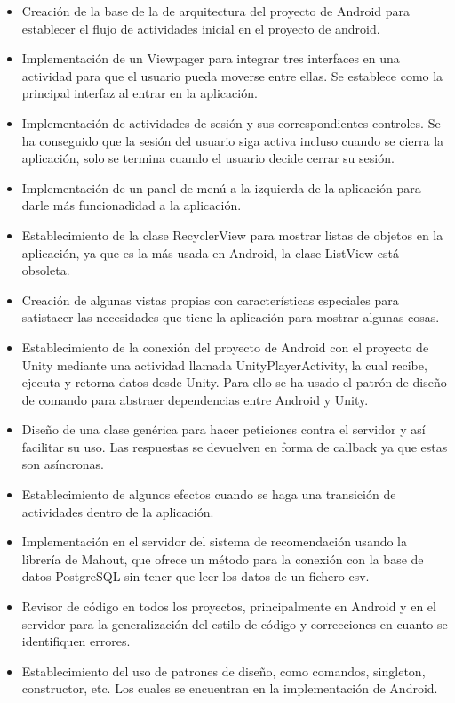 \begin{itemize}
            \item Creación de la base de la de arquitectura del proyecto de Android para establecer el flujo de actividades inicial en el proyecto de android.
            \item Implementación de un Viewpager para integrar tres interfaces en una actividad para que el usuario pueda moverse entre ellas. Se establece como la principal 
            interfaz al entrar en la aplicación.
            \item Implementación de actividades de sesión y sus correspondientes controles. Se ha conseguido que la sesión del usuario siga activa incluso cuando se cierra 
            la aplicación, solo se termina cuando el usuario decide cerrar su sesión.
            \item Implementación de un panel de menú a la izquierda de la aplicación para darle más funcionadidad a la aplicación.
            \item Establecimiento de la clase RecyclerView para mostrar listas de objetos en la aplicación, ya que es la más usada en Android, la clase ListView está obsoleta.
            \item Creación de algunas vistas propias con características especiales para satistacer las necesidades 
            que tiene la aplicación para mostrar algunas cosas.
            \item Establecimiento de la conexión del proyecto de Android con el proyecto de Unity mediante una actividad llamada UnityPlayerActivity, la cual recibe, ejecuta y retorna datos
            desde Unity. Para ello se ha usado el patrón de diseño de comando para abstraer dependencias entre Android y Unity.
            \item Diseño de una clase genérica para hacer peticiones contra el servidor y así facilitar su uso. Las respuestas se devuelven 
            en forma de callback ya que estas son asíncronas.
            \item Establecimiento de algunos efectos cuando se haga una transición de actividades dentro de la aplicación.
            \item Implementación en el servidor del sistema de recomendación usando la 
            librería de Mahout, que ofrece un método para la conexión con la base de datos 
            PostgreSQL sin tener que leer los datos de un fichero csv.
            \item Revisor de código en todos los proyectos, principalmente en Android y en el servidor para la generalización del estilo de código y correcciones 
            en cuanto se identifiquen errores.
            \item Establecimiento del uso de patrones de diseño, como comandos, singleton, 
            constructor, etc. Los cuales se encuentran en la implementación de Android. 
        \end{itemize}
